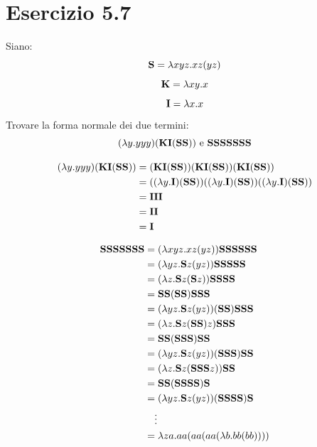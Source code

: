 	\section{Esercizio 5.7}
	
		Siano:
		\begin{equation*}
			\textbf{S} = \lambda xyz.xz(yz)
		\end{equation*}
		\begin{equation*}
			\textbf{K} = \lambda xy.x
		\end{equation*}
		\begin{equation*}
			\textbf{I} = \lambda x.x
		\end{equation*}
		Trovare la forma normale dei due termini:
		\begin{equation*}
			(\lambda y.yyy)(\textbf{K}\textbf{I}(\textbf{SS}))\text{ e }\textbf{SSSSSSS}
		\end{equation*}
		
		\sectionline
		
		\begin{align*}
			(\lambda y.yyy)(\textbf{K}\textbf{I}(\textbf{SS})) & =
			(\textbf{K}\textbf{I}(\textbf{SS}))(\textbf{K}\textbf{I}(\textbf{SS}))(\textbf{K}\textbf{I}(\textbf{SS}))\\
			& = ((\lambda y.\textbf{I})(\textbf{SS}))((\lambda y.\textbf{I})(\textbf{SS}))((\lambda
			y.\textbf{I})(\textbf{SS}))\\
			& = \textbf{I}\textbf{I}\textbf{I}\\
			& = \textbf{I}\textbf{I}\\
			& = \textbf{I}\\
		\end{align*}
		
		\begin{align*}
			\textbf{SSSSSSS} & = (\lambda xyz.xz(yz))\textbf{SSSSSS}\\
			& = (\lambda yz.\textbf{S} z(yz))\textbf{SSSSS}\\
			& = (\lambda z.\textbf{S} z(\textbf{S} z))\textbf{SSSS}\\
			& = \textbf{SS}(\textbf{SS})\textbf{SSS}\\
			& = (\lambda yz.\textbf{S} z(yz))(\textbf{SS})\textbf{SSS}\\
			& = (\lambda z.\textbf{S} z(\textbf{SS})z)\textbf{SSS}\\
			& = \textbf{SS}(\textbf{SSS})\textbf{SS}\\
			& = (\lambda yz.\textbf{S} z(yz))(\textbf{SSS})\textbf{SS}\\
			& = (\lambda z.\textbf{S} z(\textbf{SSS} z))\textbf{SS}\\
			& = \textbf{SS}(\textbf{SSSS})\textbf{S}\\
			& = (\lambda yz.\textbf{S} z(yz))(\textbf{SSSS})\textbf{S}\\
			& \quad \vdots\\
			& = \lambda za.a a(a a(a a(\lambda b.b b(b b))))\\
		\end{align*}
		
